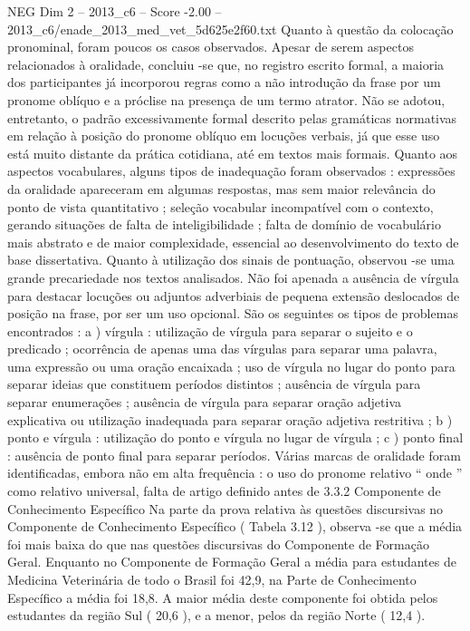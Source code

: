 \begin{textsample}{NEG Dim 2 – 2013\_c6 – Score -2.00 – 2013\_c6/enade\_2013\_med\_vet\_5d625e2f60.txt}
Quanto à questão da colocação pronominal, foram poucos os casos observados.
Apesar de serem aspectos relacionados à oralidade, concluiu -se que, no registro escrito formal, a maioria dos participantes já incorporou regras como a não introdução da frase por um pronome oblíquo e a próclise na presença de um termo atrator.
Não se adotou, entretanto, o padrão excessivamente formal descrito pelas gramáticas normativas em relação à posição do pronome oblíquo em locuções verbais, já que esse uso está muito distante da prática cotidiana, até em textos mais formais.
Quanto aos aspectos vocabulares, alguns tipos de inadequação foram observados : expressões da oralidade apareceram em algumas respostas, mas sem maior relevância do ponto de vista quantitativo ; seleção vocabular incompatível com o contexto, gerando situações de falta de inteligibilidade ; falta de domínio de vocabulário mais abstrato e de maior complexidade, essencial ao desenvolvimento do texto de base dissertativa.
Quanto à utilização dos sinais de pontuação, observou -se uma grande precariedade nos textos analisados.
Não foi apenada a ausência de vírgula para destacar locuções ou adjuntos adverbiais de pequena extensão deslocados de posição na frase, por ser um uso opcional.
São os seguintes os tipos de problemas encontrados : a ) vírgula : utilização de vírgula para separar o sujeito e o predicado ; ocorrência de apenas uma das vírgulas para separar uma palavra, uma expressão ou uma oração encaixada ; uso de vírgula no lugar do ponto para separar ideias que constituem períodos distintos ; ausência de vírgula para separar enumerações ; ausência de vírgula para separar oração adjetiva explicativa ou utilização inadequada para separar oração adjetiva restritiva ; b ) ponto e vírgula : utilização do ponto e vírgula no lugar de vírgula ; c ) ponto final : ausência de ponto final para separar períodos.
Várias marcas de oralidade foram identificadas, embora não em alta frequência : o uso do pronome relativo “ onde ” como relativo universal, falta de artigo definido antes de 3.3.2 Componente de Conhecimento Específico Na parte da prova relativa às questões discursivas no Componente de Conhecimento Específico ( Tabela 3.12 ), observa -se que a média foi mais baixa do que nas questões discursivas do Componente de Formação Geral.
Enquanto no Componente de Formação Geral a média para estudantes de Medicina Veterinária de todo o Brasil foi 42,9, na Parte de Conhecimento Específico a média foi 18,8.
A maior média deste componente foi obtida pelos estudantes da região Sul ( 20,6 ), e a menor, pelos da região Norte ( 12,4 ).

\end{textsample}
